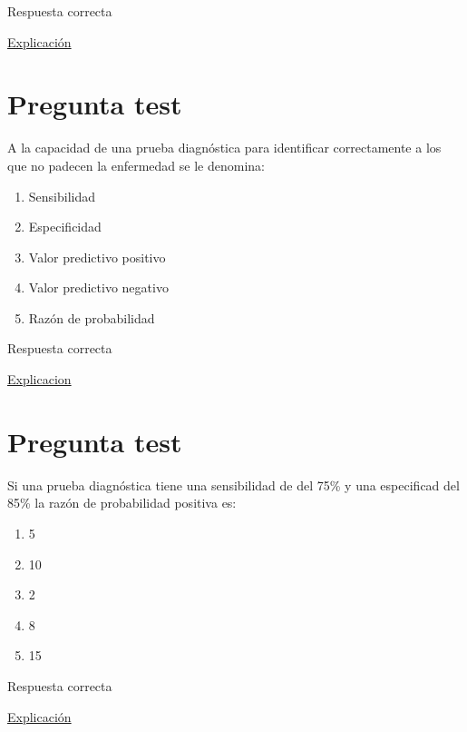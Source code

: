 \documentclass[
]{book}
\providecommand{\tightlist}{%
  \setlength{\itemsep}{0pt}\setlength{\parskip}{0pt}}
\begin{document}
Respuesta correcta

\href{https://www.elsevier.es/es-revista-educacion-medica-71-articulo-el-odds-ratio-su-interpretacion-S1575181317300360}{Explicación}

\hypertarget{pregunta-test-84}{%
\section{Pregunta test}\label{pregunta-test-84}}

A la capacidad de una prueba diagnóstica para identificar correctamente a los que no padecen la enfermedad se le denomina:

\begin{enumerate}
\def\labelenumi{\alph{enumi})}
\tightlist
\item
  Sensibilidad
\item
  Especificidad
\item
  Valor predictivo positivo
\item
  Valor predictivo negativo
\item
  Razón de probabilidad
\end{enumerate}

Respuesta correcta

\href{https://1fjmanzano.github.io/bioestadistica/relaci\%C3\%B3n-entre-variables-cualitativas.html\#diagno\%CC\%81stico-cli\%CC\%81nico}{Explicacion}

\hypertarget{pregunta-test-85}{%
\section{Pregunta test}\label{pregunta-test-85}}

Si una prueba diagnóstica tiene una sensibilidad de del 75\% y una especificad del 85\% la razón de probabilidad positiva es:

\begin{enumerate}
\def\labelenumi{\alph{enumi})}
\tightlist
\item
  5
\item
  10
\item
  2
\item
  8
\item
  15
\end{enumerate}

Respuesta correcta

\href{https://www.elsevier.es/es-revista-revista-argentina-radiologia-383-articulo-likelihood-ratio-razon-verosimilitud-definicion-S0048761916301910}{Explicación}
\end{document}

